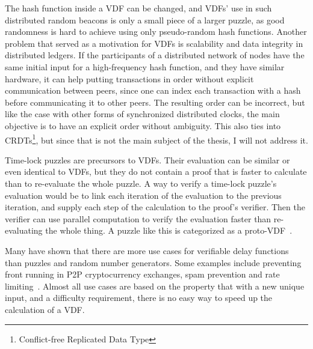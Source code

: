 The hash function inside a VDF can be changed, and VDFs' use in such distributed random beacons is only a small piece of a larger puzzle, as good randomness is hard to achieve using only pseudo-random hash functions. Another problem that served as a motivation for VDFs is scalability and data integrity in distributed ledgers. If the participants of a distributed network of nodes have the same initial input for a high-frequency hash function, and they have similar hardware, it can help putting transactions in order without explicit communication between peers, since one can index each transaction with a hash before communicating it to other peers. The resulting order can be incorrect, but like the case with other forms of synchronized distributed clocks, the main objective is to have an explicit order without ambiguity. This also ties into CRDTs\footnote{Conflict-free Replicated Data Type}, but since that is not the main subject of the thesis, I will not address it.

Time-lock puzzles are precursors to VDFs. Their evaluation can be similar or even identical to VDFs, but they do not contain a proof that is faster to calculate than to re-evaluate the whole puzzle. A way to verify a time-lock puzzle's evaluation would be to link each iteration of the evaluation to the previous iteration, and supply each step of the calculation to the proof's verifier. Then the verifier can use parallel computation to verify the evaluation faster than re-evaluating the whole thing. A puzzle like this is categorized as a proto-VDF~\cite{Boneh2018-uz}.

Many have shown that there are more use cases for verifiable delay functions than puzzles and random number generators. Some examples include preventing front running in P2P cryptocurrency exchanges, spam prevention and rate limiting~\cite{noauthor_undated-hk}. Almost all use cases are based on the property that with a new unique input, and a difficulty requirement, there is no easy way to speed up the calculation of a VDF.

